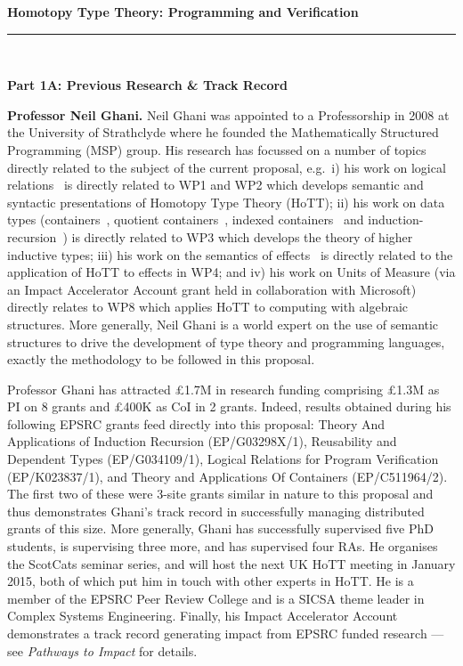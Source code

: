 \documentclass[a4paper,11pt]{article}
\newcommand{\eg}{{e.g.}\ }
\begin{document}
\thispagestyle{plain}
\begin{center}
  {\Large {\bf Homotopy Type Theory: Programming and Verification}}\\[1ex] 
\vspace*{-0.1in}

  \rule{140mm}{.5mm}\\[2ex]
\end{center}

\noindent
{\bf \Large Part 1A: Previous Research \& Track Record}

\textbf{Professor Neil Ghani.} Neil Ghani was appointed to a
Professorship in 2008 at the University of Strathclyde where he
founded the Mathematically Structured Programming (MSP) group. His
research has focussed on a number of topics directly related to the
subject of the current proposal, \eg i) his work on logical
relations~\cite{neil2014relParamDep} is directly related to WP1 and
WP2 which develops semantic and syntactic presentations of Homotopy
Type Theory (HoTT); ii) his work on data types
(containers~\cite{alti:cont-tcs}, quotient
containers~\cite{alti:mpc04}, indexed
containers~\cite{altenkirchGhaniHancockMcBrideMorris:indexedContainers}
and
induction-recursion~\cite{ghani:fibredIR})
is directly related to WP3 which develops the theory of higher
inductive types; iii) his work on the semantics of
effects~\cite{atkeyGhaniJacobsJohann:effects} is directly related to
the application of HoTT to effects in WP4; and iv) his work on Units
of Measure (via an Impact Accelerator Account grant held in
collaboration with Microsoft) directly relates to WP8 which applies
HoTT to computing with algebraic structures. More generally, Neil
Ghani is a world expert on the use of semantic structures to drive the
development of type theory and programming languages, exactly the
methodology to be followed in this proposal.

Professor Ghani has attracted \pounds 1.7M in research funding
comprising \pounds 1.3M as PI on 8 grants and \pounds 400K as CoI in 2
grants.  Indeed, results obtained during his following EPSRC grants
feed directly into this proposal: Theory And Applications of Induction
Recursion (EP/G03298X/1), Reusability and Dependent Types
(EP/G034109/1), Logical Relations for Program Verification
(EP/K023837/1), and Theory and Applications Of Containers
(EP/C511964/2). The first two of these were 3-site grants similar in
nature to this proposal and thus demonstrates Ghani's track record in
successfully managing distributed grants of this size. More generally,
Ghani has successfully supervised five PhD students, is supervising
three more, and has supervised four RAs. He organises the ScotCats
seminar series, and will host the next UK HoTT meeting in January
2015, both of which put him in touch with other experts in HoTT. He is
a member of the EPSRC Peer Review College and is a SICSA theme leader
in Complex Systems Engineering. Finally, his Impact Accelerator
Account demonstrates a track record generating impact from EPSRC
funded research --- see {\em Pathways to Impact} for details.
\end{document}
